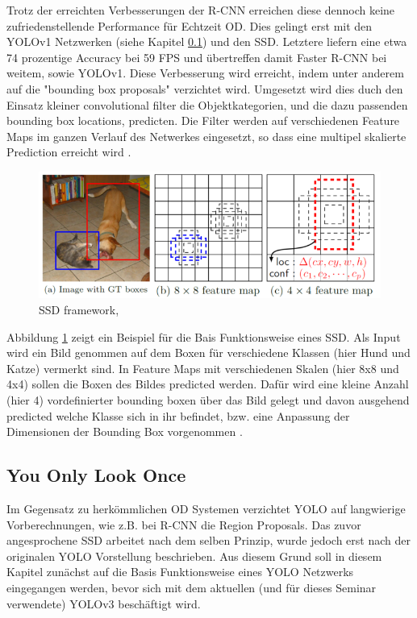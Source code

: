 Trotz der erreichten Verbesserungen der \ac{R-CNN} erreichen diese dennoch keine zufriedenstellende Performance für Echtzeit \ac{OD}. Dies gelingt erst mit den YOLOv1 Netzwerken (siehe Kapitel \ref{sec:yolo-einführung}) und den \ac{SSD}. Letztere liefern eine etwa 74 prozentige Accuracy bei 59 \ac{FPS} \cite[S.2]{Liu.08.12.2015} und übertreffen damit Faster \ac{R-CNN} bei weitem, sowie YOLOv1. Diese Verbesserung wird erreicht, indem unter anderem auf die "bounding box proposals" \cite[S.2]{Liu.08.12.2015} verzichtet wird. Umgesetzt wird dies duch den Einsatz kleiner convolutional filter die Objektkategorien, und die dazu passenden bounding box locations, predicten. Die Filter werden auf verschiedenen Feature Maps im ganzen Verlauf des Netwerkes eingesetzt, so dass eine multipel skalierte Prediction erreicht wird \cite[S.2]{Liu.08.12.2015}.

\begin{figure}[H]
    \centering
    \includegraphics[scale=0.5]{./img/ssd.png}
    \caption{SSD framework, \cite[S.3]{Liu.08.12.2015}}
    \label{fig:ssd}
\end{figure}

Abbildung \ref{fig:ssd} zeigt ein Beispiel für die Bais Funktionsweise eines \ac{SSD}. Als Input wird ein Bild genommen auf dem Boxen für verschiedene Klassen (hier Hund und Katze) vermerkt sind. In Feature Maps mit verschiedenen Skalen (hier 8x8 und 4x4) sollen die Boxen des Bildes predicted werden. Dafür wird eine kleine Anzahl (hier 4) vordefinierter bounding boxen über das Bild gelegt und davon ausgehend predicted welche Klasse sich in ihr befindet, bzw. eine Anpassung der Dimensionen der Bounding Box vorgenommen \cite[S.3f.]{Liu.08.12.2015}.

\subsection{You Only Look Once}\label{sec:yolo-einführung}

Im Gegensatz zu herkömmlichen \ac{OD} Systemen verzichtet \ac{YOLO} auf langwierige Vorberechnungen, wie z.B. bei \ac{R-CNN} die Region Proposals. Das zuvor angesprochene \ac{SSD} arbeitet nach dem selben Prinzip, wurde jedoch erst nach der originalen YOLO Vorstellung beschrieben. Aus diesem Grund soll in diesem Kapitel zunächst auf die Basis Funktionsweise eines \ac{YOLO} Netzwerks eingegangen werden, bevor sich mit dem aktuellen (und für dieses Seminar verwendete) YOLOv3 beschäftigt wird.

